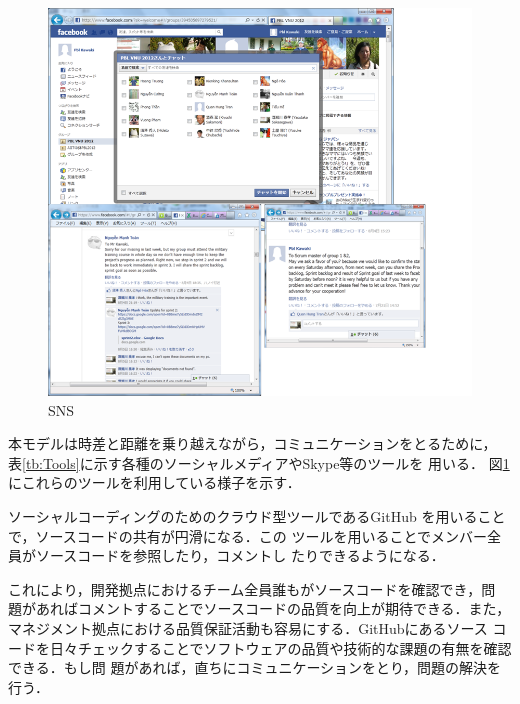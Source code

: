 \documentclass[a4j, 12Q, twocolumn, twoside]{jsarticle}
\begin{document}
\begin{figure}[htb]
  \begin{center}
   \includegraphics[width=\columnwidth]{./figures/SNS.png}
   \caption{SNS}
   \label{fig:SNS}
  \end{center}
\end{figure}


本モデルは時差と距離を乗り越えながら，コミュニケーションをとるために，
表\ref{tb:Tools}に示す各種のソーシャルメディアやSkype等のツールを
用いる．
図\ref{fig:SNS}
にこれらのツールを利用している様子を示す．

ソーシャルコーディングのためのクラウド型ツールであるGitHub
を用いることで，ソースコードの共有が円滑になる．この
ツールを用いることでメンバー全員がソースコードを参照したり，コメントし
たりできるようになる．

これにより，開発拠点におけるチーム全員誰もがソースコードを確認でき，問
題があればコメントすることでソースコードの品質を向上が期待できる．また，
マネジメント拠点における品質保証活動も容易にする．GitHubにあるソース
コードを日々チェックすることでソフトウェアの品質や技術的な課題の有無を確認できる．もし問
題があれば，直ちにコミュニケーションをとり，問題の解決を行う．
\end{document}
